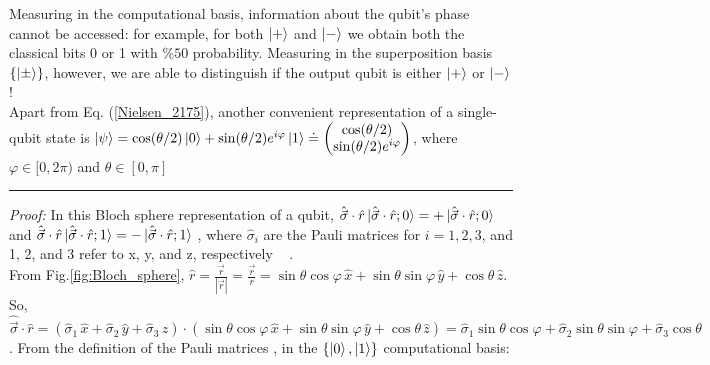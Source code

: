 \documentclass[11pt]{article}
\numberwithin{equation}{section} %
\numberwithin{figure}{section} %
\begin{document}
\begin{appendices}
Measuring in the computational basis, information about the qubit’s phase cannot be accessed: for example, for both $\ket{+}$ and $\ket{-}$ we obtain both the classical bits 0 or 1 with $\%50$ probability. Measuring in the superposition basis $\{\ket{\pm}\}$, however, we are able to distinguish if the output qubit is either $\ket{+}$ or $\ket{-}$!\\

Apart from Eq. (\ref{Nielsen_2175}), another convenient representation of a single-qubit state is $\ket{\psi}=\cos(\theta/2)\ket{0}+\sin(\theta/2)e^{i\varphi}\ket{1}\doteq\begin{pmatrix}\cos(\theta/2)\\\sin(\theta/2)e^{i\varphi}\end{pmatrix}$, where $\varphi\in[0,2\pi)$ and $\theta\in[0,\pi]$\\

 \noindent
{\color{black} \rule{\linewidth}{0.2mm}}
\emph{Proof:}
In this Bloch sphere representation of a qubit, $\hat{\vec{\sigma}}\cdot\hat{r}\ket{\hat{\vec{\sigma}}\cdot\hat{r};0}=+\ket{\hat{\vec{\sigma}}\cdot\hat{r};0}$ and $\hat{\vec{\sigma}}\cdot\hat{r}\ket{\hat{\vec{\sigma}}\cdot\hat{r};1}=-\ket{\hat{\vec{\sigma}}\cdot\hat{r};1}$ \cite[p.~xxix, l.~24]{Nielsen}, where $\hat{\sigma}_i$ are the Pauli matrices for $i=1,2,3$, and 1, 2, and 3 refer to x, y, and z, respectively  $\,\,\,$  \cite[p.~169, Eq.~(3.2.32)]{Sakurai}\cite[p.~65, Fig.~2.2]{Nielsen}.\\

 From Fig.\ref{fig:Bloch_sphere}, $\hat{r}=\frac{\vec{r}}{|\vec{r}|}=\frac{\vec{r}}{r}=\sin\theta\cos\varphi\,\hat{x}+\sin\theta\sin\varphi\,\hat{y}+\cos\theta\,\hat{z}$. So, $\hat{\vec{\sigma}}\cdot\hat{r}=(\hat{\sigma}_1\,\hat{x}+\hat{\sigma}_2\,\hat{y}+\hat{\sigma}_3\,\hat{z})\cdot(\sin\theta\cos\varphi\,\hat{x}+\sin\theta\sin\varphi\,\hat{y}+\cos\theta\,\hat{z})=\hat{\sigma}_1\sin\theta\cos\varphi+\hat{\sigma}_2\sin\theta\sin\varphi+\hat{\sigma}_3\cos\theta$. From the definition of the Pauli matrices \cite[p.~169, Eq.~(3.2.32)]{Sakurai}, in the $\{\ket{0},\ket{1}\}$ computational basis:
 

\end{appendices}
\end{document}
